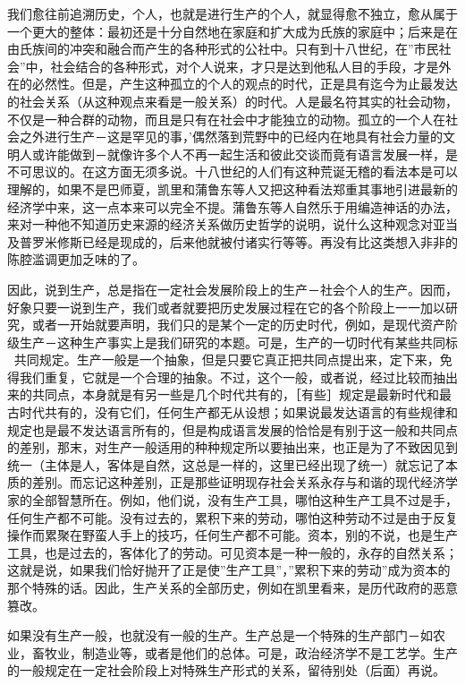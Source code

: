 \documentclass[a4paper,twoside,12pt,AutoFakeBold]{ctexart}
\begin{document}
我们愈往前追溯历史，个人，也就是进行生产的个人，就显得愈不独立，愈从属于一个更大的整体：最初还是十分自然地在家庭和扩大成为氏族的家庭中；后来是在由氏族间的冲突和融合而产生的各种形式的公社中。只有到十八世纪，在”市民社会”中，社会结合的各种形式，对个人说来，才只是达到他私人目的手段，才是外在的必然性。但是，产生这种孤立的个人的观点的时代，正是具有迄今为止最发达的社会关系（从这种观点来看是一般关系）的时代。人是最名符其实的社会动物，不仅是一种合群的动物，而且是只有在社会中才能独立的动物。孤立的一个人在社会之外进行生产－这是罕见的事，’偶然落到荒野中的已经内在地具有社会力量的文明人或许能做到－就像许多个人不再一起生活和彼此交谈而竟有语言发展一样，是不可思议的。在这方面无须多说。十八世纪的人们有这种荒诞无稽的看法本是可以理解的，如果不是巴师夏，凯里和蒲鲁东等人又把这种看法郑重其事地引进最新的经济学中来，这一点本来可以完全不提。蒲鲁东等人自然乐于用编造神话的办法，来对一种他不知道历史来源的经济关系做历史哲学的说明，说什么这种观念对亚当及普罗米修斯已经是现成的，后来他就被付诸实行等等。再没有比这类想入非非的陈腔滥调更加乏味的了。

因此，说到生产，总是指在一定社会发展阶段上的生产－社会个人的生产。因而，好象只要一说到生产，我们或者就要把历史发展过程在它的各个阶段上一一加以研究，或者一开始就要声明，我们只的是某个一定的历史时代，例如，是现代资产阶级生产－这种生产事实上是我们研究的本题。可是，生产的一切时代有某些共同标，共同规定。生产一般是一个抽象，但是只要它真正把共同点提出来，定下来，免得我们重复，它就是一个合理的抽象。不过，这个一般，或者说，经过比较而抽出来的共同点，本身就是有另一些是几个时代共有的，［有些］规定是最新时代和最古时代共有的，没有它们，任何生产都无从设想；如果说最发达语言的有些规律和规定也是最不发达语言所有的，但是构成语言发展的恰恰是有别于这一般和共同点的差别，那末，对生产一般适用的种种规定所以要抽出来，也正是为了不致因见到统一（主体是人，客体是自然，这总是一样的，这里已经出现了统一）就忘记了本质的差别。而忘记这种差别，正是那些证明现存社会关系永存与和谐的现代经济学家的全部智慧所在。例如，他们说，没有生产工具，哪怕这种生产工具不过是手，任何生产都不可能。没有过去的，累积下来的劳动，哪怕这种劳动不过是由于反复操作而累聚在野蛮人手上的技巧，任何生产都不可能。资本，别的不说，也是生产工具，也是过去的，客体化了的劳动。可见资本是一种一般的，永存的自然关系；这就是说，如果我们恰好抛开了正是使”生产工具”，”累积下来的劳动”成为资本的那个特殊的话。因此，生产关系的全部历史，例如在凯里看来，是历代政府的恶意篡改。

如果没有生产一般，也就没有一般的生产。生产总是一个特殊的生产部门－如农业，畜牧业，制造业等，或者是他们的总体。可是，政治经济学不是工艺学。生产的一般规定在一定社会阶段上对特殊生产形式的关系，留待别处（后面）再说。
\end{document}
